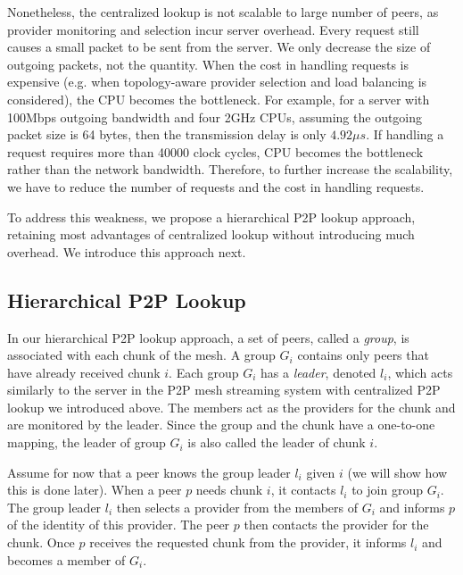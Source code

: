     Nonetheless, the centralized lookup is not scalable to large
    number of peers, as provider monitoring and selection incur
    server overhead.  Every request still causes a small packet to be
    sent from the server.  We only decrease the size of outgoing 
    packets, not the quantity.   When
    the cost in handling requests is expensive
    (e.g. when topology-aware provider selection and load balancing is considered), 
    the CPU becomes the bottleneck. 
    For example, for a server with 100Mbps outgoing bandwidth and four 2GHz
    CPUs, assuming the outgoing packet size is 64 bytes, 
    then the transmission delay is only $4.92\mu{s}$. If 
    handling a request requires more than 40000 clock cycles, CPU becomes 
    the bottleneck rather than the network bandwidth. Therefore, to further increase the
    scalability, we have to reduce the number of requests and the
    cost in handling requests.
    
    To address this weakness, we propose a hierarchical P2P lookup approach,
    retaining most advantages of centralized lookup without 
    introducing much overhead.  We introduce this approach next.  

\subsection{Hierarchical P2P Lookup}
\label{s:hp2p}
    In our hierarchical P2P %
    lookup approach, a set of
    peers, called a \textit{group}, is associated with each
    chunk of the mesh.  A group $G_i$ contains only peers
    that have already received chunk $i$.  Each group
    $G_i$ has a \textit{leader}, denoted $l_i$, which acts
    similarly to the server in the 
    P2P mesh streaming system with centralized P2P lookup we
    introduced
    above.  The members act as the providers for the chunk
    and are monitored by the leader.  Since the group and
    the chunk have a one-to-one mapping, the leader of group
    $G_i$ is also called the leader of chunk $i$.

    Assume for now that a peer knows the group leader $l_i$
    given $i$ (we will show how this is done later).  When a
    peer $p$ needs chunk $i$, it contacts $l_i$ to join
    group $G_i$.  The group leader $l_i$ then selects a
    provider from the members of $G_i$ and informs $p$ of the
    identity of this provider.  The peer $p$ then contacts the
    provider for the chunk.  Once %
    $p$ receives the
    requested chunk from the provider, it informs $l_i$ and
    becomes a member of $G_i$.

